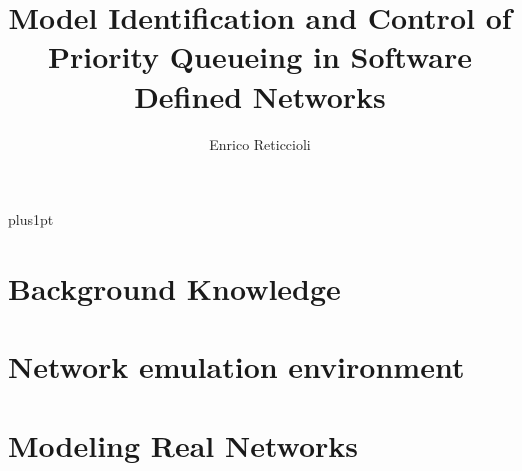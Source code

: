 \documentclass[12pt, a4paper, twoside, openright]{ociamthesis}  %
\title{Model Identification and Control of Priority Queueing in Software Defined Networks} %
\author{Enrico Reticcioli}             %
\begin{document}
\baselineskip=18pt plus1pt

\setcounter{secnumdepth}{4}
\setcounter{tocdepth}{4}

\maketitle                  %




\begin{romanpages}          %
\tableofcontents            %
\listoffigures              %
\listoftables               %
\end{romanpages}            %

%



\chapter{Background Knowledge}



\chapter{Network emulation environment}



\chapter{Modeling Real Networks}
\end{document}
